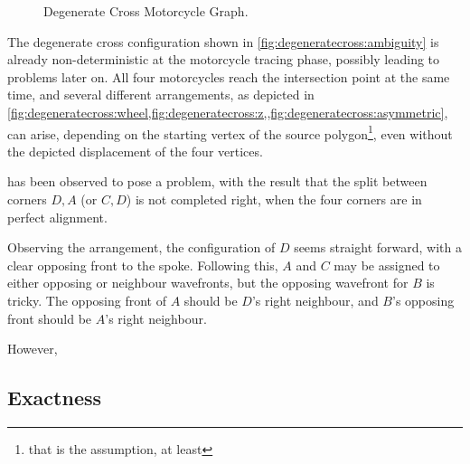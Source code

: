 \documentclass[12pt,a4paper,oneside,openany]{article}
\begin{document}
\begin{figure}[htpb]
\begin{center}
{		\label{fig:degeneratecross:z}}
\caption{Degenerate Cross Motorcycle Graph.}
\label{fig:degeneratecross}
\end{center}
\end{figure}


The degenerate cross configuration shown in \cref{fig:degeneratecross:ambiguity} is already non-deterministic at the motorcycle tracing phase, possibly leading to problems later on. All four motorcycles reach the intersection point at the same time, and several different arrangements, as depicted in \cref{fig:degeneratecross:wheel,fig:degeneratecross:z,,fig:degeneratecross:asymmetric}, can arise, depending on the starting vertex of the source polygon\footnote{that is the assumption, at least}, even without the depicted displacement of the four vertices.

 has been observed to pose a problem, with the result that the split between corners $D,A$ (or $C,D$) is not completed right, when the four corners are in perfect alignment.

Observing the arrangement, the configuration of $D$ seems straight forward, with a clear opposing front to the spoke. Following this, $A$ and $C$ may be assigned to either opposing or neighbour wavefronts, but the opposing wavefront for $B$ is tricky. The opposing front of $A$ should be $D$'s right neighbour, and $B$'s opposing front should be $A$'s right neighbour.

However, 

\subsection{Exactness}
\end{document}
